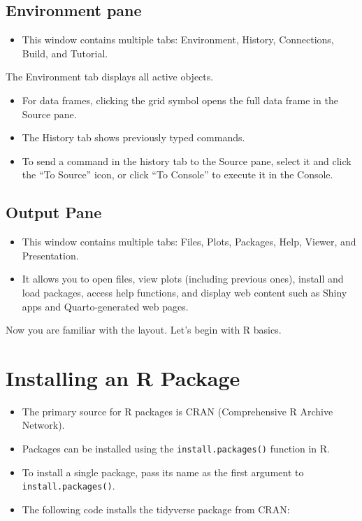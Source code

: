 \documentclass[
  letterpaper,
  DIV=11,
  numbers=noendperiod]{scrreprt}
\providecommand{\tightlist}{%
  \setlength{\itemsep}{0pt}\setlength{\parskip}{0pt}}\usepackage{longtable,booktabs,array}
\begin{document}
\subsection{Environment pane}\label{environment-pane}

\begin{itemize}
\tightlist
\item
  This window contains multiple tabs: Environment, History, Connections,
  Build, and Tutorial.
\end{itemize}

The Environment tab displays all active objects.

\begin{itemize}
\item
  For data frames, clicking the grid symbol opens the full data frame in
  the Source pane.
\item
  The History tab shows previously typed commands.
\item
  To send a command in the history tab to the Source pane, select it and
  click the ``To Source'' icon, or click ``To Console'' to execute it in
  the Console.
\end{itemize}

\subsection{Output Pane}\label{output-pane}

\begin{itemize}
\item
  This window contains multiple tabs: Files, Plots, Packages, Help,
  Viewer, and Presentation.
\item
  It allows you to open files, view plots (including previous ones),
  install and load packages, access help functions, and display web
  content such as Shiny apps and Quarto-generated web pages.
\end{itemize}

Now you are familiar with the layout. Let's begin with R basics.

\section{Installing an R Package}\label{installing-an-r-package}

\begin{itemize}
\item
  The primary source for R packages is CRAN (Comprehensive R Archive
  Network).
\item
  Packages can be installed using the \texttt{install.packages()}
  function in R.
\item
  To install a single package, pass its name as the first argument to
  \texttt{install.packages()}.
\item
  The following code installs the tidyverse package from CRAN:
\end{itemize}
\end{document}
